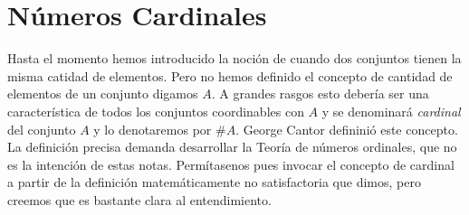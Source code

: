 \section{Números Cardinales}

Hasta el momento hemos introducido la noción de cuando dos conjuntos tienen la misma catidad de elementos. Pero no hemos definido el concepto de cantidad de elementos de un conjunto digamos $A$.  A grandes rasgos esto debería ser una característica de todos los conjuntos coordinables con $A$ y se denominará \emph{cardinal} del conjunto $A$ y lo denotaremos por $\#A$. George Cantor defininió este concepto. La definición precisa demanda desarrollar la Teoría de números ordinales, que no es la intención de estas notas. Permítasenos pues invocar el concepto de cardinal a partir de la definición matemáticamente no satisfactoria que dimos, pero creemos que es bastante clara al entendimiento. 

